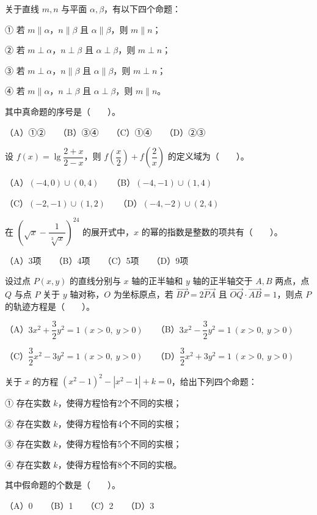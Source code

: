 \begin{question}
关于直线 $m,n$ 与平面 $\alpha,\beta$，有以下四个命题：

① 若 $m\parallel\alpha$，$n\parallel\beta$ 且 $\alpha\parallel\beta$，则 $m\parallel n$；

② 若 $m\perp\alpha$，$n\perp\beta$ 且 $\alpha\perp\beta$，则 $m\perp n$；

③ 若 $m\perp\alpha$，$n\parallel\beta$ 且 $\alpha\parallel\beta$，则 $m\perp n$；

④ 若 $m\parallel\alpha$，$n\perp\beta$ 且 $\alpha\perp\beta$，则 $m\parallel n$。

其中真命题的序号是\mbox{（　　）}。

（A）①②　　（B）③④　　（C）①④　　（D）②③

\end{question}
\begin{question}
设 $f(x)=\lg\dfrac{2+x}{2-x}$，则 $f\left(\dfrac{x}{2}\right)+f\left(\dfrac{2}{x}\right)$ 的定义域为\mbox{（　　）}。

（A）$(-4,0)\cup(0,4)$　　（B）$(-4,-1)\cup(1,4)$

（C）$(-2,-1)\cup(1,2)$　　（D）$(-4,-2)\cup(2,4)$

\end{question}
\begin{question}
在 $\left(\sqrt{x}-\dfrac{1}{\sqrt[3]{x}}\right)^{24}$ 的展开式中，$x$ 的幂的指数是整数的项共有\mbox{（　　）}。

（A）3项　　（B）4项　　（C）5项　　（D）9项

\end{question}
\begin{question}
设过点 $P(x,y)$ 的直线分别与 $x$ 轴的正半轴和 $y$ 轴的正半轴交于 $A,B$ 两点，点 $Q$ 与点 $P$ 关于 $y$ 轴对称，$O$ 为坐标原点，若 $\overrightarrow{BP}=2\overrightarrow{PA}$ 且 $\overrightarrow{OQ}\cdot\overrightarrow{AB}=1$，则点 $P$ 的轨迹方程是\mbox{（　　）}。

（A）$3x^2+\dfrac32y^2=1\ (x>0,\ y>0)$　　（B）$3x^2-\dfrac32y^2=1\ (x>0,\ y>0)$

（C）$\dfrac32x^2-3y^2=1\ (x>0,\ y>0)$　　（D）$\dfrac32x^2+3y^2=1\ (x>0,\ y>0)$

\end{question}
\begin{question}
关于 $x$ 的方程 $(x^2-1)^2-|x^2-1|+k=0$，给出下列四个命题：

① 存在实数 $k$，使得方程恰有2个不同的实根；

② 存在实数 $k$，使得方程恰有4个不同的实根；

③ 存在实数 $k$，使得方程恰有5个不同的实根；

④ 存在实数 $k$，使得方程恰有8个不同的实根。

其中假命题的个数是\mbox{（　　）}。

（A）0　　（B）1　　（C）2　　（D）3

\end{question}

